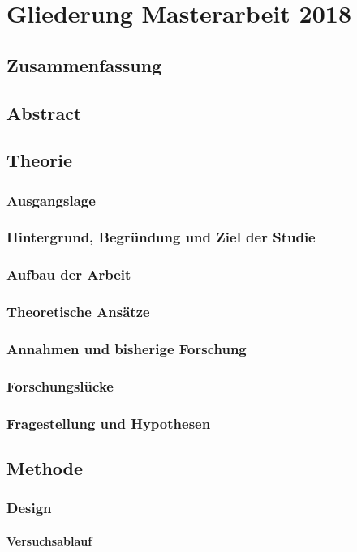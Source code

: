 \section{Gliederung Masterarbeit 2018 }

\subsection{Zusammenfassung}
\subsection{Abstract}
\subsection{Theorie}
\subsubsection{Ausgangslage}
\subsubsection{Hintergrund, Begründung und Ziel der Studie}
\subsubsection{Aufbau der Arbeit}
\subsubsection{Theoretische Ansätze}
\subsubsection{Annahmen und bisherige Forschung}
\subsubsection{Forschungslücke}
\subsubsection{Fragestellung und Hypothesen}
\subsection{Methode}
\subsubsection{Design}
\paragraph{Versuchsablauf}
